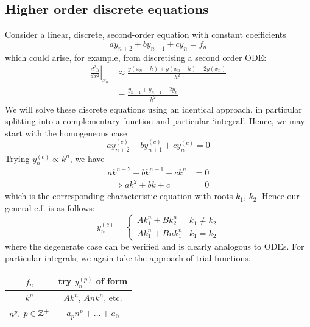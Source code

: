 \documentclass{../template/note}
\begin{document}
    \subsection{Higher order discrete equations}

    Consider a linear, discrete, second-order equation with constant coefficients
    \[
        ay_{n+2} + by_{n+1} + cy_n = f_n
    \]
    which could arise, for example, from discretising a second order ODE:
    \begin{align*}
        \left.\frac{d^2y}{dx^2}\right|_{x_n} &\approx \frac{y(x_n+h)+y(x_n-h)-2y(x_n)}{h^2} \\
        &= \frac{y_{n+1}+y_{n-1}-2y_n}{h^2}
    \end{align*}
    We will solve these discrete equations using an identical approach, in particular splitting into a complementary function and particular `integral'. Hence, we may start with the homogeneous case
    \[
        ay_{n+2}^{(c)} + by_{n+1}^{(c)} + cy_n^{(c)} = 0
    \]
    Trying \(y_n^{(c)} \propto k^n\), we have
    \begin{align*}
        ak^{n+2} + bk^{n+1} + ck^n &= 0 \\
        \implies ak^2 + bk + c &= 0
    \end{align*}
    which is the corresponding characteristic equation with roots \(k_1\), \(k_2\). Hence our general c.f. is as follows:
    \[
        y_n^{(c)} = \begin{cases}
            Ak_1^n + Bk_2^n & k_1 \neq k_2 \\
            Ak_1^n + Bnk_1^n & k_1 = k_2
        \end{cases}
    \]
    where the degenerate case can be verified and is clearly analogous to ODEs. For particular integrals, we again take the approach of trial functions.
    
    \begin{center}
        \begin{tabular}{c c}
            \(f_n\) & try \(y_n^{(p)}\) of form \\
            \hline
            \(k^n\) & \(Ak^n\), \(Ank^n\), etc. \\
            \(n^p\), \(p \in \mathbb Z^+\) & \(a_pn^p + \dots + a_0\)
        \end{tabular}
    \end{center}
    
\end{document}

